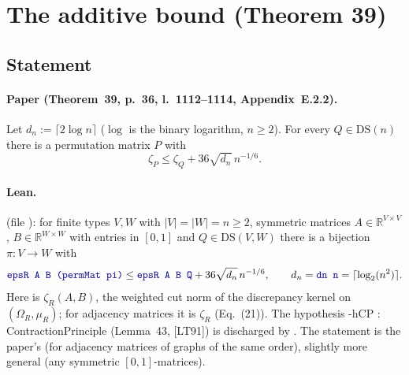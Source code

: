 \section{The additive bound (Theorem 39)}

\subsection{Statement}

\paragraph{Paper (Theorem~39, p.~36, l.~1112--1114, Appendix~E.2.2).} Let $d_n:=\lceil 2\log n\rceil$
($\log$ is the binary logarithm, $n\ge2$). For every $Q\in\mathrm{DS}(n)$ there is a permutation matrix $P$ with
\[ \zeta_P\le\zeta_Q+36\sqrt{d_n}\,n^{-1/6}. \]

\paragraph{Lean.}  (file ):
for finite types $V,W$ with $|V|=|W|=n\ge2$, symmetric matrices $A\in\mathbb R^{V\times V}$, $B\in\mathbb R^{W\times W}$
with entries in $[0,1]$ and $Q\in\mathrm{DS}(V,W)$ there is a bijection $\pi\colon V\to W$ with
\[ \lean{epsR A B (permMat pi)}\le\lean{epsR A B Q}+36\sqrt{d_n}\,n^{-1/6},\qquad d_n=\lean{dn n}=\lceil\log_2(n^2)\rceil. \]
Here  is $\zeta_R(A,B)$, the weighted cut norm of the discrepancy kernel on $(\Omega_R,\mu_R)$;
for adjacency matrices it is $\zeta_R$ (Eq.~(21)). The hypothesis \hyp{hCP : ContractionPrinciple} (Lemma~43,
[LT91]) is discharged by . The statement is the paper's (for adjacency matrices
of graphs of the same order), slightly more general (any symmetric $[0,1]$-matrices).

